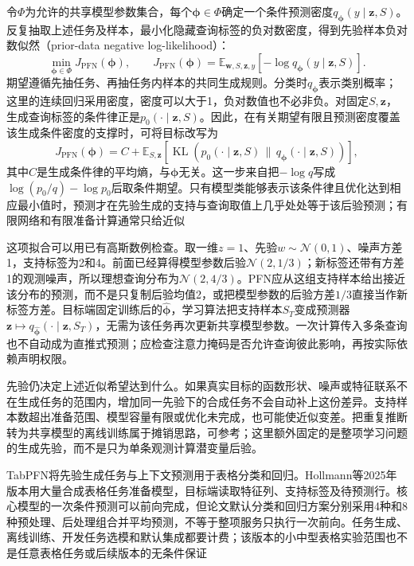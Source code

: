 令$\Phi$为允许的共享模型参数集合，每个$\bm\phi\in\Phi$确定一个条件预测密度$q_{\bm\phi}(y\mid\bm z,S)$。反复抽取上述任务及样本，最小化隐藏查询标签的负对数密度，得到先验样本负对数似然（prior-data negative log-likelihood）：
\begin{equation}
  \min_{\bm\phi\in\Phi}J_{\mathrm{PFN}}(\bm\phi),
  \qquad
  J_{\mathrm{PFN}}(\bm\phi)
    =\mathbb E_{\bm w,S,\bm z,y}
      [-\log q_{\bm\phi}(y\mid\bm z,S)].
  \label{eq:ket-transfer-pfn-objective}
\end{equation}
期望遵循先抽任务、再抽任务内样本的共同生成规则。分类时$q_{\bm\phi}$表示类别概率；这里的连续回归采用密度，密度可以大于1，负对数值也不必非负。对固定$S,\bm z$，生成查询标签的条件律正是$p_0(\cdot\mid\bm z,S)$。因此，在有关期望有限且预测密度覆盖该生成条件密度的支撑时，可将目标改写为
\begin{equation}
  J_{\mathrm{PFN}}(\bm\phi)
   =C+\mathbb E_{S,\bm z}
      \!\left[\operatorname{KL}\!\left(
        p_0(\cdot\mid\bm z,S)
        \,\|\,q_{\bm\phi}(\cdot\mid\bm z,S)
      \right)\right],
  \label{eq:ket-transfer-pfn-kl}
\end{equation}
其中$C$是生成条件律的平均熵，与$\bm\phi$无关。这一步来自把$-\log q$写成$\log(p_0/q)-\log p_0$后取条件期望。只有模型类能够表示该条件律且优化达到相应最小值时，预测才在先验生成的支持与查询取值上几乎处处等于该后验预测；有限网络和有限准备计算通常只给近似

这项拟合可以用已有高斯数例检查。取一维$z=1$、先验$w\sim\mathcal N(0,1)$、噪声方差1，支持标签为2和4。前面已经算得模型参数后验$\mathcal N(2,1/3)$；新标签还带有方差1的观测噪声，所以理想查询分布为$\mathcal N(2,4/3)$。PFN应从这组支持样本给出接近该分布的预测，而不是只复制后验均值2，或把模型参数的后验方差$1/3$直接当作新标签方差。目标端固定训练后的$\hat{\bm\phi}$，学习算法把支持样本$S_T$变成预测器$\bm z\mapsto q_{\hat{\bm\phi}}(\cdot\mid\bm z,S_T)$，无需为该任务再次更新共享模型参数。一次计算传入多条查询也不自动成为直推式预测；应检查注意力掩码是否允许查询彼此影响，再按实际依赖声明权限。

先验仍决定上述近似希望达到什么。如果真实目标的函数形状、噪声或特征联系不在生成任务的范围内，增加同一先验下的合成任务不会自动补上这份差异。支持样本数超出准备范围、模型容量有限或优化未完成，也可能使近似变差。把重复推断转为共享模型的离线训练属于摊销思路，可参考；这里额外固定的是整项学习问题的生成先验，而不是只为单条观测计算潜变量后验。

TabPFN将先验生成任务与上下文预测用于表格分类和回归。Hollmann等2025年版本用大量合成表格任务准备模型，目标端读取特征列、支持标签及待预测行。核心模型的一次条件预测可以前向完成，但论文默认分类和回归方案分别采用4种和8种预处理、后处理组合并平均预测，不等于整项服务只执行一次前向。任务生成、离线训练、开发任务选模和默认集成都要计费；该版本的小中型表格实验范围也不是任意表格任务或后续版本的无条件保证

